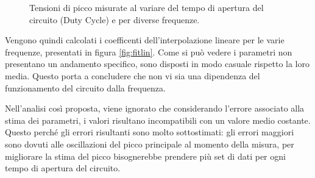  \begin{figure}
\centering
{}
\caption{Tensioni di picco misurate al variare del tempo di apertura del circuito (Duty Cycle) e per diverse frequenze.}
\label{fig:tensioni}
\end{figure}


Vengono quindi calcolati i coefficenti dell'interpolazione lineare per le varie frequenze, presentati in figura \ref{fig:fitlin}. 
Come si può vedere i parametri non presentano un andamento specifico, sono disposti in modo casuale rispetto la loro media. Questo porta a concludere che non vi sia una dipendenza del funzionamento del circuito dalla frequenza.

Nell'analisi così proposta, viene ignorato che considerando l'errore associato alla stima dei parametri, i valori risultano incompatibili con un valore medio costante. Questo perché gli errori risultanti sono molto sottostimati: gli errori maggiori sono dovuti alle oscillazioni del picco principale al momento della misura, per migliorare la stima del picco bisognerebbe prendere più set di dati per ogni tempo di apertura del circuito.

